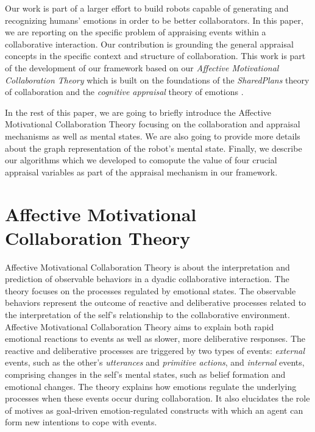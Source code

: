 \documentclass[letterpaper]{article}
\begin{document}
Our work is part of a larger effort to build robots capable of generating and
recognizing humans' emotions in order to be better collaborators. In this paper,
we are reporting on the specific problem of appraising events within a
collaborative interaction. Our contribution is grounding the general appraisal
concepts in the specific context and structure of collaboration. This work is
part of the development of our framework based on our \textit{Affective
Motivational Collaboration Theory} which is built on the foundations of the
\textit{SharedPlans} theory of collaboration \cite{grosz:plans-discourse} and
the \textit{cognitive appraisal} theory of emotions
\cite{gratch:domain-independent}.

In the rest of this paper, we are going to briefly introduce the Affective
Motivational Collaboration Theory focusing on the collaboration and appraisal
mechanisms as well as mental states. We are also going to provide more details
about the graph representation of the robot's mental state. Finally, we describe
our algorithms which we developed to comopute the value of four crucial
appraisal variables as part of the appraisal mechanism in our framework.

\vspace*{-2mm}
\section{Affective Motivational Collaboration Theory}

Affective Motivational Collaboration Theory is about the interpretation and
prediction of observable behaviors in a dyadic collaborative interaction. The
theory focuses on the processes regulated by emotional states. The observable
behaviors represent the outcome of reactive and deliberative processes related
to the interpretation of the self's relationship to the collaborative
environment. Affective Motivational Collaboration Theory aims to explain both
rapid emotional reactions to events as well as slower, more deliberative
responses. The reactive and deliberative processes are triggered by two types of
events: \textit{external} events, such as the other's
\textit{utterances} and \textit{primitive actions}, and \textit{internal}
events, comprising changes in the self's mental states, such as belief formation
and emotional changes. The theory explains how emotions regulate the underlying
processes when these events occur during collaboration. It also elucidates the
role of motives as goal-driven emotion-regulated constructs with which an agent
can form new intentions to cope with events.
\end{document}

